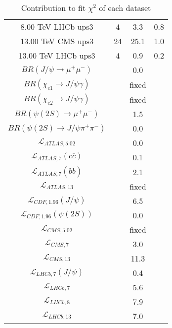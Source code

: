 \begin{table}[h!]
\begin{tabular}{c|c|c|c}
8.00 TeV LHCb ups3 & 4 & 3.3 & 0.8 \\
13.00 TeV CMS ups3 & 24 & 25.1 & 1.0 \\
13.00 TeV LHCb ups3 & 4 & 0.9 & 0.2 \\
\hline
$BR(J/\psi\rightarrow\mu^+\mu^-)$ &  & 0.0 &  \\
$BR(\chi_{c1}\rightarrow J/\psi\gamma)$ &  & fixed & \\
$BR(\chi_{c2}\rightarrow J/\psi\gamma)$ &  & fixed & \\
$BR(\psi(2S)\rightarrow\mu^+\mu^-)$ &  & 1.5 &  \\
$BR(\psi(2S)\rightarrow J/\psi\pi^+\pi^-)$ &  & 0.0 &  \\
$\mathcal L_{ATLAS,5.02}$ &  & 0.0 &  \\
$\mathcal L_{ATLAS,7}(c\overline c)$ &  & 0.1 &  \\
$\mathcal L_{ATLAS,7}(b\overline b)$ &  & 2.1 &  \\
$\mathcal L_{ATLAS,13}$ &  & fixed & \\
$\mathcal L_{CDF,1.96}(J/\psi)$ &  & 6.5 &  \\
$\mathcal L_{CDF,1.96}(\psi(2S))$ &  & 0.0 &  \\
$\mathcal L_{CMS,5.02}$ &  & fixed & \\
$\mathcal L_{CMS,7}$ &  & 3.0 &  \\
$\mathcal L_{CMS,13}$ &  & 11.3 &  \\
$\mathcal L_{LHCb,7}(J/\psi)$ &  & 0.4 &  \\
$\mathcal L_{LHCb,7}$ &  & 5.6 &  \\
$\mathcal L_{LHCb,8}$ &  & 7.9 &  \\
$\mathcal L_{LHCb,13}$ &  & 7.0 &  \\
\end{tabular}
\caption{Contribution to fit $\chi^2$ of each dataset}
\end{table}
